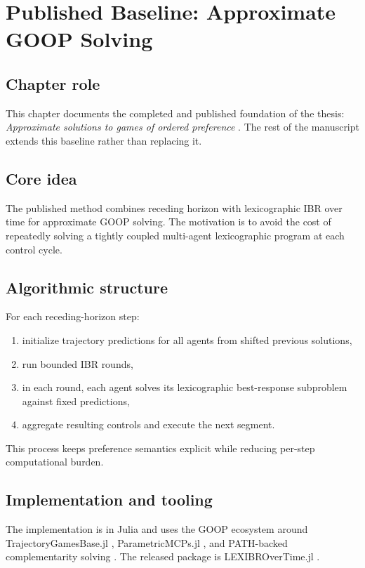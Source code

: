 \chapter{Published Baseline: Approximate GOOP Solving}

\section{Chapter role}

This chapter documents the completed and published foundation of the thesis:
\emph{Approximate solutions to games of ordered preference}
\cite{delasheras:2025}. The rest of the manuscript extends this baseline rather
than replacing it.

\section{Core idea}

The published method combines receding horizon with lexicographic IBR over time
for approximate GOOP solving. The motivation is to avoid the cost of repeatedly
solving a tightly coupled multi-agent lexicographic program at each control
cycle.

\section{Algorithmic structure}

For each receding-horizon step:

\begin{enumerate}
    \item initialize trajectory predictions for all agents from shifted previous
    solutions,
    \item run bounded IBR rounds,
    \item in each round, each agent solves its lexicographic best-response
    subproblem against fixed predictions,
    \item aggregate resulting controls and execute the next segment.
\end{enumerate}

This process keeps preference semantics explicit while reducing per-step
computational burden.

\section{Implementation and tooling}

The implementation is in Julia \cite{julia} and uses the GOOP ecosystem around
TrajectoryGamesBase.jl \cite{peters:2024a}, ParametricMCPs.jl
\cite{peters:2025}, and PATH-backed complementarity solving
\cite{dirkse:1995}. The released package is LEXIBROverTime.jl \cite{code}.

